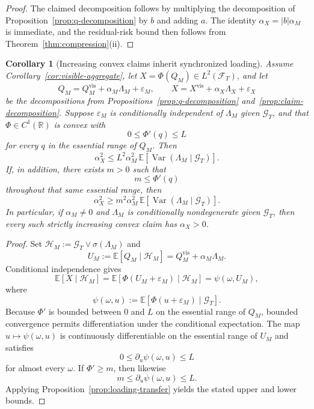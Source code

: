 \documentclass[11pt,a4paper]{amsart}
\theoremstyle{plain}
\newtheorem{corollary}[theorem]{Corollary}
\theoremstyle{definition}
\theoremstyle{remark}
\DeclareMathOperator{\Var}{Var}
\newcommand{\R}{\mathbb{R}}
\newcommand{\EE}{\mathbb{E}}
\newcommand{\cH}{\mathcal{H}}
\newcommand{\cF}{\mathcal{F}}
\newcommand{\cG}{\mathcal{G}}
\begin{document}
\begin{proof}
The claimed decomposition follows by multiplying the decomposition of
Proposition~\ref{prop:q-decomposition} by \(b\) and adding \(a\).  The identity
\(\alpha_X=|b|\alpha_M\) is immediate, and the residual-risk bound then follows from
Theorem~\ref{thm:compression}(ii).
\end{proof}

\begin{corollary}[Increasing convex claims inherit synchronized loading]\label{cor:convex-loading}
Assume Corollary~\ref{cor:visible-aggregate}, let \(X=\Phi(Q_M)\in L^2(\cF_T)\), and let
\[
        Q_M=Q_M^{\mathrm{vis}}+\alpha_M\Lambda_M+\varepsilon_M,
        \qquad
        X=X^{\mathrm{vis}}+\alpha_X\Lambda_X+\varepsilon_X
\]
be the decompositions from Propositions~\ref{prop:q-decomposition}
and~\ref{prop:claim-decomposition}.  Suppose \(\varepsilon_M\) is conditionally independent of
\(\Lambda_M\) given \(\cG_T\), and that \(\Phi\in C^1(\R)\) is convex with
\[
        0\le \Phi'(q)\le L
\]
for every \(q\) in the essential range of \(Q_M\).  Then
\[
        \alpha_X^2
        \le
        L^2\alpha_M^2\,\EE[\Var(\Lambda_M\mid \cG_T)].
\]
If, in addition, there exists \(m>0\) such that
\[
        m\le \Phi'(q)
\]
throughout that same essential range, then
\[
        \alpha_X^2
        \ge
        m^2\alpha_M^2\,\EE[\Var(\Lambda_M\mid \cG_T)].
\]
In particular, if \(\alpha_M\neq0\) and \(\Lambda_M\) is conditionally nondegenerate given
\(\cG_T\), then every such strictly increasing convex claim has \(\alpha_X>0\).
\end{corollary}

\begin{proof}
Set \(\cH_M:=\cG_T\vee \sigma(\Lambda_M)\) and
\[
        U_M:=\EE[Q_M\mid \cH_M]=Q_M^{\mathrm{vis}}+\alpha_M\Lambda_M.
\]
Conditional independence gives
\[
        \EE[X\mid \cH_M]
        =
        \EE[\Phi(U_M+\varepsilon_M)\mid \cH_M]
        =
        \psi(\omega,U_M),
\]
where
\[
        \psi(\omega,u):=\EE[\Phi(u+\varepsilon_M)\mid \cG_T].
\]
Because \(\Phi'\) is bounded between \(0\) and \(L\) on the essential range of \(Q_M\), bounded
convergence permits differentiation under the conditional expectation.  The map
\(u\mapsto \psi(\omega,u)\) is continuously differentiable on the essential range of \(U_M\) and
satisfies
\[
        0\le \partial_u\psi(\omega,u)\le L
\]
for almost every \(\omega\).  If \(\Phi'\ge m\), then likewise
\[
        m\le \partial_u\psi(\omega,u)\le L.
\]
Applying Proposition~\ref{prop:loading-transfer} yields the stated upper and lower bounds.
\end{proof}
\end{document}
